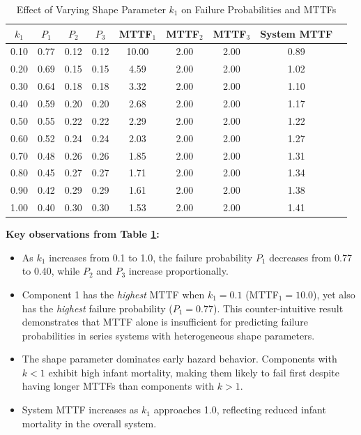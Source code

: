 \documentclass[11pt]{article}
\begin{document}
\begin{table}[htbp]
\centering
\caption{Effect of Varying Shape Parameter $k_1$ on Failure Probabilities and MTTFs}
\label{tab:vary-shape}
\small
\begin{tabular}{ccccccccc}
\hline
$k_1$ & $P_1$ & $P_2$ & $P_3$ & MTTF$_1$ & MTTF$_2$ & MTTF$_3$ & System MTTF \\
\hline
0.10 & 0.77 & 0.12 & 0.12 & 10.00 & 2.00 & 2.00 & 0.89 \\
0.20 & 0.69 & 0.15 & 0.15 & 4.59 & 2.00 & 2.00 & 1.02 \\
0.30 & 0.64 & 0.18 & 0.18 & 3.32 & 2.00 & 2.00 & 1.10 \\
0.40 & 0.59 & 0.20 & 0.20 & 2.68 & 2.00 & 2.00 & 1.17 \\
0.50 & 0.55 & 0.22 & 0.22 & 2.29 & 2.00 & 2.00 & 1.22 \\
0.60 & 0.52 & 0.24 & 0.24 & 2.03 & 2.00 & 2.00 & 1.27 \\
0.70 & 0.48 & 0.26 & 0.26 & 1.85 & 2.00 & 2.00 & 1.31 \\
0.80 & 0.45 & 0.27 & 0.27 & 1.71 & 2.00 & 2.00 & 1.34 \\
0.90 & 0.42 & 0.29 & 0.29 & 1.61 & 2.00 & 2.00 & 1.38 \\
1.00 & 0.40 & 0.30 & 0.30 & 1.53 & 2.00 & 2.00 & 1.41 \\
\hline
\end{tabular}
\end{table}

\textbf{Key observations from Table \ref{tab:vary-shape}:}

\begin{itemize}
\item As $k_1$ increases from 0.1 to 1.0, the failure probability $P_1$ decreases from 0.77 to 0.40, while $P_2$ and $P_3$ increase proportionally.
\item Component 1 has the \emph{highest} MTTF when $k_1 = 0.1$ (MTTF$_1 = 10.0$), yet also has the \emph{highest} failure probability ($P_1 = 0.77$). This counter-intuitive result demonstrates that MTTF alone is insufficient for predicting failure probabilities in series systems with heterogeneous shape parameters.
\item The shape parameter dominates early hazard behavior. Components with $k < 1$ exhibit high infant mortality, making them likely to fail first despite having longer MTTFs than components with $k > 1$.
\item System MTTF increases as $k_1$ approaches 1.0, reflecting reduced infant mortality in the overall system.
\end{itemize}
\end{document}
